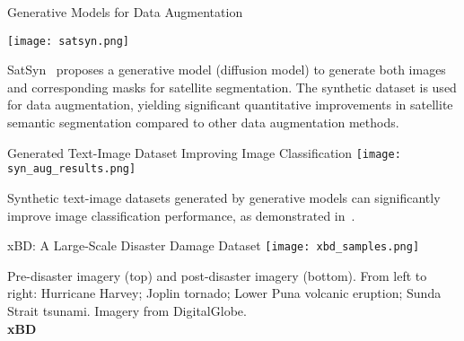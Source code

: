 \begin{refsection}
  \begin{frame}{Generative Models for Data Augmentation}
    \begin{minipage}{0.7\linewidth}
      \texttt{[image: satsyn.png]}
    \end{minipage}%
    \hfill
    \begin{minipage}{0.3\linewidth}
      \scriptsize
      SatSyn~\parencite{tokerSatSynthAugmentingImageMask2024} proposes a generative model (diffusion model) to generate both images and corresponding masks for satellite segmentation. The synthetic dataset is used for data augmentation, yielding significant quantitative improvements in satellite semantic segmentation compared to other data augmentation methods.
    \end{minipage}
    \bottomleftrefs
  \end{frame}
\end{refsection}

\begin{refsection}
  \begin{frame}{Generated Text-Image Dataset Improving Image Classification}
    \centering
    \texttt{[image: syn\_aug\_results.png]}
    
    
    \scriptsize
    Synthetic text-image datasets generated by generative models can significantly improve image classification performance, as demonstrated in~\parencite{heSYNTHETICDATAGENERATIVE2022}.
    \bottomleftrefs
  \end{frame}
\end{refsection}

\begin{refsection}
  \begin{frame}{xBD: A Large-Scale Disaster Damage Dataset}
    \centering
    \texttt{[image: xbd\_samples.png]}
    
    \vspace{0.5em}
    \scriptsize
    Pre-disaster imagery (top) and post-disaster imagery (bottom). From left to right: Hurricane Harvey; Joplin tornado; Lower Puna volcanic eruption; Sunda Strait tsunami. Imagery from DigitalGlobe.\\
    \textbf{xBD}~\parencite{guptaCreatingXBDDataset2019}
    \bottomleftrefs
  \end{frame}
\end{refsection}

